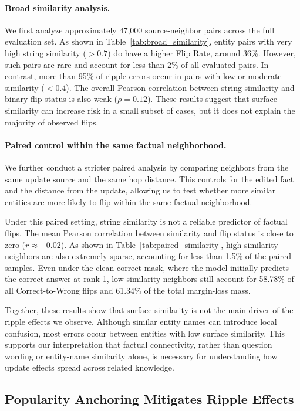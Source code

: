 \paragraph{Broad similarity analysis.}
We first analyze approximately 47,000 source-neighbor pairs across the full evaluation set. As shown in Table~\ref{tab:broad_similarity}, entity pairs with very high string similarity ($>0.7$) do have a higher Flip Rate, around 36\%. However, such pairs are rare and account for less than 2\% of all evaluated pairs. In contrast, more than 95\% of ripple errors occur in pairs with low or moderate similarity ($<0.4$). The overall Pearson correlation between string similarity and binary flip status is also weak ($\rho=0.12$). These results suggest that surface similarity can increase risk in a small subset of cases, but it does not explain the majority of observed flips.

\paragraph{Paired control within the same factual neighborhood.}
We further conduct a stricter paired analysis by comparing neighbors from the same update source and the same hop distance. This controls for the edited fact and the distance from the update, allowing us to test whether more similar entities are more likely to flip within the same factual neighborhood.

Under this paired setting, string similarity is not a reliable predictor of factual flips. The mean Pearson correlation between similarity and flip status is close to zero ($r \approx -0.02$). As shown in Table~\ref{tab:paired_similarity}, high-similarity neighbors are also extremely sparse, accounting for less than 1.5\% of the paired samples. Even under the clean-correct mask, where the model initially predicts the correct answer at rank 1, low-similarity neighbors still account for 58.78\% of all Correct-to-Wrong flips and 61.34\% of the total margin-loss mass.

Together, these results show that surface similarity is not the main driver of the ripple effects we observe. Although similar entity names can introduce local confusion, most errors occur between entities with low surface similarity. This supports our interpretation that factual connectivity, rather than question wording or entity-name similarity alone, is necessary for understanding how update effects spread across related knowledge.

\subsection{Popularity Anchoring Mitigates Ripple Effects}
\label{subsec:mitigation}

